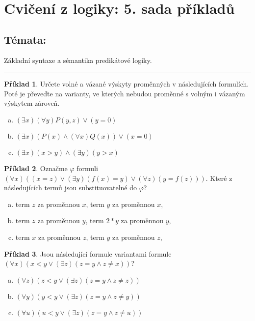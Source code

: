 \documentclass{amsart}
\theoremstyle{definition}
\newtheorem{problem}{Příklad}
\begin{document}
\section*{Cvičení z logiky: 5. sada příkladů}

\bigskip\bigskip\bigskip

\subsection*{Témata:} Základní syntaxe a sémantika predikátové logiky.

\bigskip\hrule

\bigskip\begin{problem}
Určete volné a vázané výskyty proměnných v následujících formulích. Poté je převeďte na varianty, ve kterých nebudou proměnné s volným i vázaným výskytem zároveň.
\begin{enumerate}[(a)]
   \item $(\exists x)(\forall y)P(y,z) \vee (y=0)$
   \item $(\exists x)(P(x) \wedge (\forall x)Q(x)) \vee (x=0)$
   \item $(\exists x)(x>y) \wedge (\exists y)(y>x)$
\end{enumerate}
\end{problem}

\bigskip\begin{problem}
Označme $\varphi$ formuli $(\forall x)((x=z) \vee (\exists y)(f(x)=y) \vee (\forall z)(y=f(z)))$. Které z následujících termů jsou substituovatelné do $\varphi$?
\begin{enumerate}[(a)]
   \item term $z$ za proměnnou $x$, term $y$ za proměnnou $x$,
   \item term $z$ za proměnnou $y$, term $2*y$ za proměnnou $y$,
   \item term $x$ za proměnnou $z$, term $y$ za proměnnou $z$,
\end{enumerate}
\end{problem}

\bigskip\begin{problem}
Jsou následující formule variantami formule $(\forall x)(x<y \vee (\exists z)(z=y \wedge z\ne x))$?
\begin{enumerate}[(a)]
\item $(\forall z)(z<y \vee (\exists z)(z=y \wedge z\ne z))$
\item $(\forall y)(y<y \vee (\exists z)(z=y \wedge z\ne y))$
\item $(\forall u)(u<y \vee (\exists z)(z=y \wedge z\ne u))$
\end{enumerate}
\end{problem}
\end{document}
